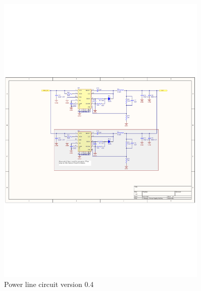 \begin{figure}[H]
	\begin{centering}
		 \includegraphics[width=0.9\textwidth,page=1,angle=0]{images/SIG60_v0_4}
		\caption{Power line circuit version 0.4}
	\end{centering}
\end{figure}

